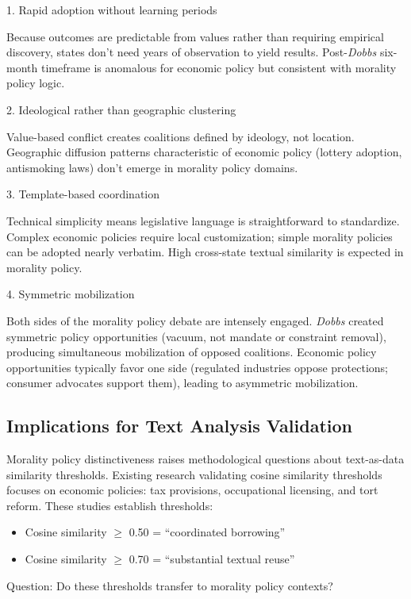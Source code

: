 1. Rapid adoption without learning periods

Because outcomes are predictable from values rather than requiring empirical discovery, states don't need years of observation to yield results. Post-\emph{Dobbs} six-month timeframe is anomalous for economic policy but consistent with morality policy logic.

2. Ideological rather than geographic clustering

Value-based conflict creates coalitions defined by ideology, not location. Geographic diffusion patterns characteristic of economic policy (lottery adoption, antismoking laws) don't emerge in morality policy domains.

3. Template-based coordination

Technical simplicity means legislative language is straightforward to standardize. Complex economic policies require local customization; simple morality policies can be adopted nearly verbatim. High cross-state textual similarity is expected in morality policy.

4. Symmetric mobilization

Both sides of the morality policy debate are intensely engaged. \emph{Dobbs} created symmetric policy opportunities (vacuum, not mandate or constraint removal), producing simultaneous mobilization of opposed coalitions. Economic policy opportunities typically favor one side (regulated industries oppose protections; consumer advocates support them), leading to asymmetric mobilization.

\subsection{Implications for Text Analysis Validation}

Morality policy distinctiveness raises methodological questions about text-as-data similarity thresholds. Existing research validating cosine similarity thresholds focuses on economic policies: tax provisions, occupational licensing, and tort reform. These studies establish thresholds:

\begin{itemize}
\item Cosine similarity $\geq$ 0.50 = ``coordinated borrowing''
\item Cosine similarity $\geq$ 0.70 = ``substantial textual reuse''
\end{itemize}

Question: Do these thresholds transfer to morality policy contexts?

